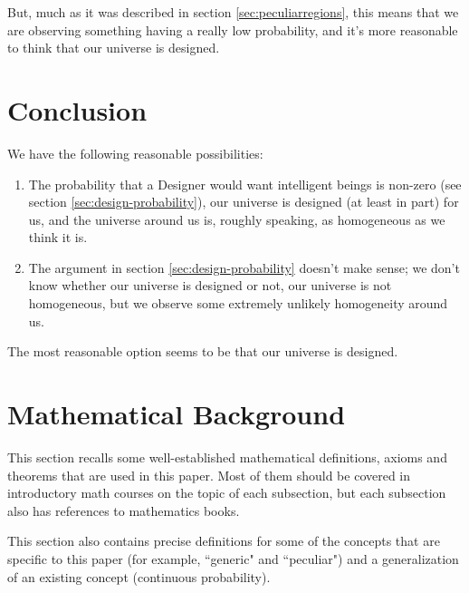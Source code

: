 \documentclass[a4paper
,draft
]{article}
\newcommand{\ghilimele}[1]{``#1"}
\begin{document}
But, much as it was described in section \ref{sec:peculiarregions},
this means that we are observing
something having a really low probability, and it's more reasonable to
think that our universe is designed.

\section{Conclusion}
\label{sec:conclusion}

We have the following reasonable possibilities:

\begin{enumerate}
\item The probability that a Designer would want intelligent beings
      is non-zero (see section \ref{sec:design-probability}),
      our universe is designed (at least in part) for us,
      and the universe around us is, roughly speaking, as homogeneous as we
      think it is.
\item The argument in section \ref{sec:design-probability} doesn't make sense;
      we don't know whether our universe is designed or not,
      our universe is not homogeneous, but we observe some
      extremely unlikely homogeneity around us.
\end{enumerate}

The most reasonable option seems to be that our universe is designed.

\section{Mathematical Background}
\label{sec:background}

This section recalls some well-established mathematical definitions, axioms and theorems that are used in this paper.
Most of them should be covered in introductory math courses
on the topic of each subsection, but each subsection also
has references to mathematics books.

This section also contains precise definitions for some of the concepts that
are specific to this paper
(for example, \ghilimele{generic} and \ghilimele{peculiar})
and a generalization of an existing concept (continuous probability).
\end{document}
